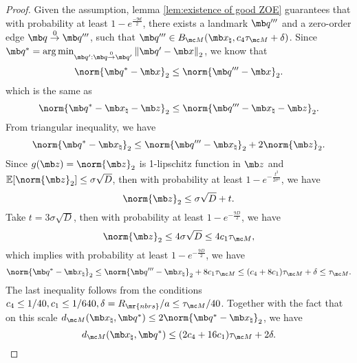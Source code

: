 \begin{proof}
     Given the assumption,  lemma \ref{lem:existence of good ZOE} guarantees that with probability at least $1 - e^{\frac{-9d}{2}}$, there exists a landmark $\mb q'''$ and a zero-order edge $\mb q \overset{0}{\rightarrow} \mb q'''$, such that $\mb q''' \in B_{\mc M}(\mb x_\natural, c_4\tau_{\mc M}+\delta)$.
    Since $\mb q^* = \arg\min_{\mb q': \mb q \overset{0}{\rightarrow} \mb q'}\left\|\mb q' -\mb x\right\|_2$, we know that
    \begin{equation}\label{eq:ZOS output is closer than good edge}
        \norm{\mb q^* - \mb x}_2 \leq \norm{\mb q''' - \mb x}_2.
    \end{equation} 
    which is the same as 
    \begin{equation}
        \norm{\mb q^* - \mb x_\natural - \mb z}_2 \leq \norm{\mb q''' - \mb x_\natural - \mb z}_2.
    \end{equation} 
From triangular inequality, we have 
\begin{equation}
 \norm{\mb q^* - \mb x_\natural}_2 \le \norm{\mb q''' - \mb x_\natural}_2 + 2\norm{\mb z}_2.  
\end{equation}
Since $g(\mb z)=\norm{\mb z}_2$ is 1-lipschitz function in $\mb z$ and $\mathbb E[\norm{\mb z}_2] \leq \sigma \sqrt{D}$, then with probability at least $1-e^{-\frac{t^2}{2\sigma^2}}$, we have
\begin{equation}
    \norm{\mb z}_2 
    \leq \sigma \sqrt{D} + t.
\end{equation}
Take $t=3\sigma \sqrt{D}$, then with probability at least $1-e^{-\frac{9D}{2}}$, we have
\begin{equation}\label{eq:high prob bound for norm of z}
     \norm{\mb z}_2 
    \leq 4\sigma\sqrt{D} \le 4c_1 \tau_{\mc M},
\end{equation}
which implies with probability at least $1-e^{-\frac{9D}{2}}$, we have
\begin{equation}
 \norm{\mb q^* - \mb x_\natural}_2 \le \norm{\mb q''' - \mb x_\natural}_2 + 8c_1 \tau_{\mc M}  \le (c_4 + 8 c_1) \tau_{\mc M}+\delta  \le \tau_{\mc M}.
\end{equation}
The last inequality follows from the conditions $c_4 \leq 1/40, c_1 \leq 1/640, \delta = R_{\mr{nbrs}}/a\leq \tau_{\mc M}/40$. Together with the fact that on this scale $d_{\mc M}(\mb x_\natural, \mb q^*) \le 2 \norm{\mb q^* - \mb x_\natural}_2$, we have 
\begin{equation}
d_{\mc M}(\mb x_\natural, \mb q^*) \le (2c_4 + 16 c_1)\tau_{\mc M}+2\delta.
\end{equation}
\end{proof}






    
